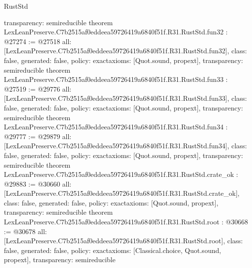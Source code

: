 \begin{lexlean}{RustStd}
\begin{coremodule}
{  transparency: semireducible
}
theorem LexLeanPreserve.C7b2515af0eddeea59726419a6840f51f.R31.RustStd.fun32 : @27274 := @27518 {
  all: [LexLeanPreserve.C7b2515af0eddeea59726419a6840f51f.R31.RustStd.fun32],
  class: false,
  generated: false,
  policy: exact{axioms: [Quot.sound, propext]},
  transparency: semireducible
}
theorem LexLeanPreserve.C7b2515af0eddeea59726419a6840f51f.R31.RustStd.fun33 : @27519 := @29776 {
  all: [LexLeanPreserve.C7b2515af0eddeea59726419a6840f51f.R31.RustStd.fun33],
  class: false,
  generated: false,
  policy: exact{axioms: [Quot.sound, propext]},
  transparency: semireducible
}
theorem LexLeanPreserve.C7b2515af0eddeea59726419a6840f51f.R31.RustStd.fun34 : @29777 := @29879 {
  all: [LexLeanPreserve.C7b2515af0eddeea59726419a6840f51f.R31.RustStd.fun34],
  class: false,
  generated: false,
  policy: exact{axioms: [Quot.sound, propext]},
  transparency: semireducible
}
theorem LexLeanPreserve.C7b2515af0eddeea59726419a6840f51f.R31.RustStd.crate_ok : @29883 := @30660 {
  all: [LexLeanPreserve.C7b2515af0eddeea59726419a6840f51f.R31.RustStd.crate_ok],
  class: false,
  generated: false,
  policy: exact{axioms: [Quot.sound, propext]},
  transparency: semireducible
}
theorem LexLeanPreserve.C7b2515af0eddeea59726419a6840f51f.R31.RustStd.root : @30668 := @30678 {
  all: [LexLeanPreserve.C7b2515af0eddeea59726419a6840f51f.R31.RustStd.root],
  class: false,
  generated: false,
  policy: exact{axioms: [Classical.choice, Quot.sound, propext]},
  transparency: semireducible
}


\end{coremodule}
\end{lexlean}
